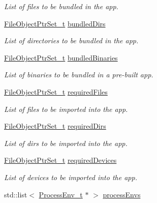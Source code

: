 \begin{DoxyCompactItemize}
\begin{DoxyCompactList}\small\item\em List of files to be bundled in the app. \end{DoxyCompactList}\item 
\hyperlink{file_system_object_8h_a47249ccd5f5ed84092b6523e81f5a398}{File\+Object\+Ptr\+Set\+\_\+t} \hyperlink{struct_app__t_add4b5c614e370be2a157587a749b5f32}{bundled\+Dirs}
\begin{DoxyCompactList}\small\item\em List of directories to be bundled in the app. \end{DoxyCompactList}\item 
\hyperlink{file_system_object_8h_a47249ccd5f5ed84092b6523e81f5a398}{File\+Object\+Ptr\+Set\+\_\+t} \hyperlink{struct_app__t_a5003e0be23052b9f7d41d08cac9e3aeb}{bundled\+Binaries}
\begin{DoxyCompactList}\small\item\em List of binaries to be bundled in a pre-\/built app. \end{DoxyCompactList}\item 
\hyperlink{file_system_object_8h_a47249ccd5f5ed84092b6523e81f5a398}{File\+Object\+Ptr\+Set\+\_\+t} \hyperlink{struct_app__t_a90425c1ff75f7e53cee33d9fa874a41f}{required\+Files}
\begin{DoxyCompactList}\small\item\em List of files to be imported into the app. \end{DoxyCompactList}\item 
\hyperlink{file_system_object_8h_a47249ccd5f5ed84092b6523e81f5a398}{File\+Object\+Ptr\+Set\+\_\+t} \hyperlink{struct_app__t_a09f9b61df8fe308408bc4eb8b35252e3}{required\+Dirs}
\begin{DoxyCompactList}\small\item\em List of dirs to be imported into the app. \end{DoxyCompactList}\item 
\hyperlink{file_system_object_8h_a47249ccd5f5ed84092b6523e81f5a398}{File\+Object\+Ptr\+Set\+\_\+t} \hyperlink{struct_app__t_a0189b5b467b6e898f5018f9ac84ad158}{required\+Devices}
\begin{DoxyCompactList}\small\item\em List of devices to be imported into the app. \end{DoxyCompactList}\item 
std\+::list$<$ \hyperlink{struct_process_env__t}{Process\+Env\+\_\+t} $\ast$ $>$ \hyperlink{struct_app__t_ab7c3d2143731959cf84154eb8cc98cc7}{process\+Envs}

\end{DoxyCompactItemize}
